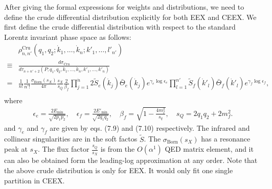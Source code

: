 After giving the formal expressions for weights and distributions, we need to define the crude differential distribution explicitly for both EEX and CEEX. We first define the crude differential distribution with respect to the standard Lorentz invariant phase space as follows:
\begin{align}
&\rho^\text{Cru}_{\dot{n},n'}(q_1,q_2;\dot{k}_1,\ldots,\dot{k}_n;k'_1,\ldots,l'_{n'})\nonumber\\
\equiv&\frac{d\sigma_\text{Cru}}{d\tau_{n+n'+2}(P;q_1,q_2,\dot{k}_1,\ldots,\dot{k}_{\dot{n}},k'_1,\ldots,k'_n)}\nonumber\\
=&\frac{1}{\dot{n}!}\frac{1}{n'!}\frac{\sigma_\text{Born}(s_X)}{4\pi}\frac{s_X}{s_Q}\frac{2}{\beta_f}\prod_{j=1}^{\dot{n}}2\widetilde{S}_e(\dot{k}_j)\bar{\Theta}_e(\dot{k}_j)e^{\gamma_e\log\epsilon_e}\prod_{l=1}^{n'}\widetilde{S}_f(\dot{k}'_l)\bar{\Theta}_f(\dot{k}'_l)e^{\gamma_f\log\epsilon_f},\nonumber\\
\end{align}
where 
\begin{align*}
\epsilon_e=\frac{2E_\text{min}}{\sqrt{2p_1p_2}},\quad \epsilon_f=\frac{2E'_\text{min}}{\sqrt{2q_1q_2}},\quad \beta_f=\sqrt{1-\frac{4m^2_f}{s_q}},\quad s_Q=2q_1q_2+2m^2_f.
\end{align*}
and $\gamma_e$ and $\gamma_f$ are given by eqs. (7.9) and (7.10) respectively. The infrared and collinear singularities are in the soft factos $\widetilde{S}$. The $\sigma_\text{Born}(s_X)$ has a resonance peak at $s_X$. The flux factor $\frac{s_Q}{s_X}$ is from the $O(\alpha^1)$ QED matrix element, and it can also be obtained form the leading-log approximation at any order. Note that the above crude distribution is only for EEX. It would only fit one single partition in CEEX. 

